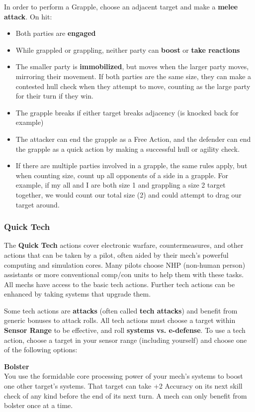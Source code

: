 In order to perform a Grapple, choose an adjacent target and make a \textbf{melee attack}. On hit:
\begin{itemize}
    \item Both parties are \textbf{engaged}
    \item While grappled or grappling, neither party can \textbf{boost} or \textbf{take reactions}
    \item The smaller party is \textbf{immobilized}, but moves when the larger party moves, mirroring their movement. If both parties are the same size, they can make a contested hull check when they attempt to move, counting as the large party for their turn if they win.
    \item The grapple breaks if either target breaks adjacency (is knocked back for example)
    \item The attacker can end the grapple as a Free Action, and the defender can end the grapple as a quick action by making a successful hull or agility check.
    \item If there are multiple parties involved in a grapple, the same rules apply, but when counting size, count up all opponents of a side in a grapple. For example, if my all and I are both size 1 and grappling a size 2 target together, we would count our total size (2) and could attempt to drag our target around. 
\end{itemize}

\subsubsection{Quick Tech}
The \textbf{Quick Tech} actions cover electronic warfare, countermeasures, and other actions that can be taken by a pilot, often aided by their mech’s powerful computing and simulation cores. Many pilots choose NHP (non-human person) assistants or more conventional comp/con units to help them with these tasks. All mechs have access to the basic tech actions. Further tech actions can be enhanced by taking systems that upgrade them. 


Some tech actions are \textbf{attacks} (often called \textbf{tech attacks}) and benefit from generic bonuses to attack rolls. All tech actions must choose a target within \textbf{Sensor Range} to be effective, and roll \textbf{systems vs. e-defense}. To use a tech action, choose a target in your sensor range (including yourself) and choose one of the following options:

\textbf{Bolster}\\
You use the formidable core processing power of your mech’s systems to boost one other target’s systems. That target can take +2 Accuracy on its next skill check of any kind before the end of its next turn. A mech can only benefit from bolster once at a time.

